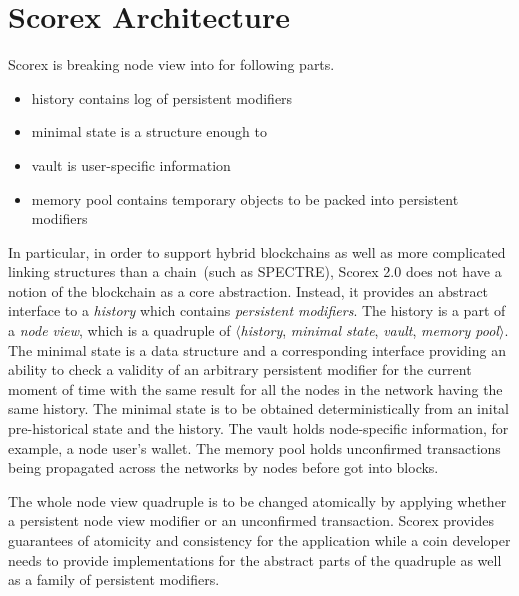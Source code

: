 
\section{Scorex Architecture}

Scorex is breaking node view into for following parts. 

\begin{itemize}
\item{history} contains log of persistent modifiers
\item{minimal state} is a structure enough to 
\item{vault} is user-specific information
\item{memory pool} contains temporary objects to be packed into persistent modifiers 
\end{itemize}

In particular, in order to support hybrid blockchains as well as more complicated linking structures than a chain~(such as SPECTRE\cite{EPRINT:SomLewZoh16}), Scorex 2.0 does not have a notion of the blockchain as a core abstraction. Instead, it provides an abstract interface to a \textit{history} which contains \textit{persistent modifiers}. The history is a part of a \textit{node view}, which is a quadruple of $\langle$\textit{history}, \textit{minimal state}, \textit{vault}, \textit{memory pool}$\rangle$. The minimal state is a data structure and a corresponding interface providing an ability to check a validity of an arbitrary persistent modifier for the current moment of time with the same result for all the nodes in the network having the same history. The minimal state is to be obtained deterministically from an inital pre-historical state and the history. The vault holds node-specific information, for example, a node user's wallet. The memory pool holds unconfirmed transactions being propagated across the networks by nodes before got into blocks. 

The whole node view quadruple is to be changed atomically by applying whether a persistent node view modifier or an unconfirmed transaction. Scorex provides guarantees of atomicity and consistency for the application while a coin developer needs to provide implementations for the abstract parts of the quadruple as well as a family of persistent modifiers.